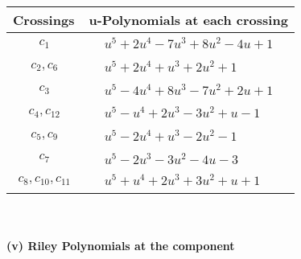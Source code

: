 \documentclass[1p]{elsarticle_modified}
\theoremstyle{definition}
\begin{document}
\begin{tabular}{m{50pt}|m{274pt}}
Crossings & \hspace{64pt}u-Polynomials at each crossing \\
\hline $$\begin{aligned}c_{1}\end{aligned}$$&$\begin{aligned}
&u^5+2 u^4-7 u^3+8 u^2-4 u+1
\end{aligned}$\\
\hline $$\begin{aligned}c_{2},c_{6}\end{aligned}$$&$\begin{aligned}
&u^5+2 u^4+u^3+2 u^2+1
\end{aligned}$\\
\hline $$\begin{aligned}c_{3}\end{aligned}$$&$\begin{aligned}
&u^5-4 u^4+8 u^3-7 u^2+2 u+1
\end{aligned}$\\
\hline $$\begin{aligned}c_{4},c_{12}\end{aligned}$$&$\begin{aligned}
&u^5- u^4+2 u^3-3 u^2+u-1
\end{aligned}$\\
\hline $$\begin{aligned}c_{5},c_{9}\end{aligned}$$&$\begin{aligned}
&u^5-2 u^4+u^3-2 u^2-1
\end{aligned}$\\
\hline $$\begin{aligned}c_{7}\end{aligned}$$&$\begin{aligned}
&u^5-2 u^3-3 u^2-4 u-3
\end{aligned}$\\
\hline $$\begin{aligned}c_{8},c_{10},c_{11}\end{aligned}$$&$\begin{aligned}
&u^5+u^4+2 u^3+3 u^2+u+1
\end{aligned}$\\
\hline
\end{tabular}\\~\\
\newpage\renewcommand{\arraystretch}{1}
\flushleft \textbf{(v) Riley Polynomials at the component}\newline \\
\end{document}
